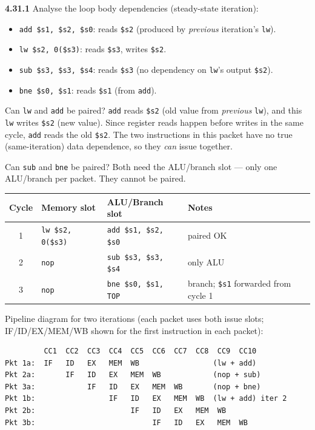 \medskip\noindent\textbf{4.31.1}
Analyse the loop body dependencies (steady-state iteration):

\begin{itemize}
\item \texttt{add \$s1, \$s2, \$s0}: reads \texttt{\$s2} (produced by
      \emph{previous} iteration's \texttt{lw}).
\item \texttt{lw \$s2, 0(\$s3)}: reads \texttt{\$s3}, writes \texttt{\$s2}.
\item \texttt{sub \$s3, \$s3, \$s4}: reads \texttt{\$s3} (no dependency on
      \texttt{lw}'s output \texttt{\$s2}).
\item \texttt{bne \$s0, \$s1}: reads \texttt{\$s1} (from \texttt{add}).
\end{itemize}

\noindent Can \texttt{lw} and \texttt{add} be paired?  \texttt{add} reads
\texttt{\$s2} (old value from \emph{previous} \texttt{lw}), and this
\texttt{lw} writes \texttt{\$s2} (new value).  Since register reads happen
before writes in the same cycle, \texttt{add} reads the old \texttt{\$s2}.
The two instructions in this packet have no true (same-iteration) data
dependence, so they \emph{can} issue together.

Can \texttt{sub} and \texttt{bne} be paired?  Both need the ALU/branch slot
--- only one ALU/branch per packet.  They cannot be paired.

\begin{center}
\begin{tabular}{clll}
\toprule
\textbf{Cycle} & \textbf{Memory slot} & \textbf{ALU/Branch slot} & \textbf{Notes} \\
\midrule
1 & \texttt{lw \$s2, 0(\$s3)} & \texttt{add \$s1, \$s2, \$s0} & paired OK \\
2 & \texttt{nop} & \texttt{sub \$s3, \$s3, \$s4} & only ALU \\
3 & \texttt{nop} & \texttt{bne \$s0, \$s1, TOP} & branch; \texttt{\$s1} forwarded from cycle 1 \\
\bottomrule
\end{tabular}
\end{center}

\noindent Pipeline diagram for two iterations (each packet uses both issue
slots; IF/ID/EX/MEM/WB shown for the first instruction in each packet):

\begin{verbatim}
         CC1  CC2  CC3  CC4  CC5  CC6  CC7  CC8  CC9  CC10
Pkt 1a:  IF   ID   EX   MEM  WB                 (lw + add)
Pkt 2a:       IF   ID   EX   MEM  WB            (nop + sub)
Pkt 3a:            IF   ID   EX   MEM  WB       (nop + bne)
Pkt 1b:                 IF   ID   EX   MEM  WB  (lw + add) iter 2
Pkt 2b:                      IF   ID   EX   MEM  WB
Pkt 3b:                           IF   ID   EX   MEM  WB
\end{verbatim}

